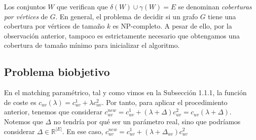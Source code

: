 \documentclass[twoside,a4paper,openright,12pt]{book}
\newcommand{\R}{\mathbb{R}}
\begin{document}
Los conjuntos $W$ que verifican que $\delta(W)\cup\gamma(W)=E$ se denominan \textit{coberturas por vértices} de $G$. En general, el problema de decidir si un grafo $G$ tiene una cobertura por vértices de tamaño $k$ es NP-completo. A pesar de ello, por la observación anterior, tampoco es estrictamente necesario que obtengamos una cobertura de tamaño mínimo para inicializar el algoritmo. 

\subsection{Problema biobjetivo}
En el matching paramétrico, tal y como vimos en la Subsección 1.1.1, la función de coste es $c_{uv}(\lambda) = c^1_{uv} + \lambda c^2_{uv}$. Por tanto, para aplicar el procedimiento anterior, tenemos que considerar $c_{uv}^{new} = c^1_{uv} + (\lambda + \Delta) c^2_{uv}= c_{uv}(\lambda+\Delta)$. Notemos que $\Delta$ no tendría por qué ser un parámetro real, sino que podríamos considerar $\Delta \in \R^{|E|}$. En ese caso, $c_{uv}^{new} = c^1_{uv} + (\lambda + \Delta_{uv}) c^2_{uv}$ 
\end{document}

